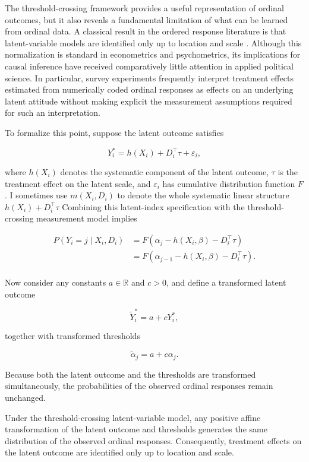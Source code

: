 \documentclass{article}
\begin{document}
The threshold-crossing framework provides a useful representation of ordinal outcomes, but it also reveals a fundamental limitation of what can be learned from ordinal data. A classical result in the ordered response literature is that latent-variable models are identified only up to location and scale \citep{Klein1997a, Schroder2017a}. Although this normalization is standard in econometrics and psychometrics, its implications for causal inference have received comparatively little attention in applied political science. In particular, survey experiments frequently interpret treatment effects estimated from numerically coded ordinal responses as effects on an underlying latent attitude without making explicit the measurement assumptions required for such an interpretation.

To formalize this point, suppose the latent outcome satisfies

\begin{equation}
  Y_i^\ast = h(X_i) + D_i^\top\tau + \varepsilon_i,
\label{eq:latent}
\end{equation}

where $h(X_i)$ denotes the systematic component of the latent outcome, $\tau$ is the treatment effect on the latent scale, and $\varepsilon_i$ has cumulative distribution function $F$. I sometimes use $m(X_{i}, D_{i})$ to denote the whole systematic linear structure $h(X_{i}) + D^{\top}_{i}\tau $ Combining this latent-index specification with the threshold-crossing measurement model implies

\[
\begin{aligned}
  P(Y_i=j\mid X_i,D_i) &= F\left( \alpha_j-h(X_i,\beta)-D_i^\top\tau \right) \\
   &= F\left( \alpha_{j-1}-h(X_i,\beta)-D_i^\top\tau \right). \\
\end{aligned}
\]

Now consider any constants $a\in\mathbb{R}$ and $c>0$, and define a transformed latent outcome

\[
\tilde Y_i^\ast = a+cY_i^\ast,
\]

together with transformed thresholds

\[
\tilde\alpha_j = a+c\alpha_j.
\]

Because both the latent outcome and the thresholds are transformed simultaneously, the probabilities of the observed ordinal responses remain unchanged.

\begin{theorem}
\label{theorem:locationscale}
Under the threshold-crossing latent-variable model, any positive affine transformation of the latent outcome and thresholds generates the same distribution of the observed ordinal responses. Consequently, treatment effects on the latent outcome are identified only up to location and scale.
\end{theorem}
\end{document}
